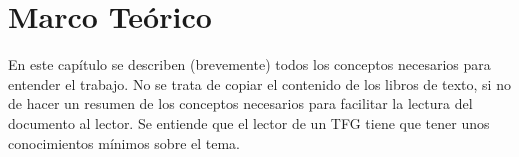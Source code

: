 \chapter{Marco Teórico}

En este capítulo se describen (brevemente) todos los conceptos necesarios para entender el trabajo. No se trata de copiar el contenido de los libros de texto, si no de hacer un resumen de los conceptos necesarios para facilitar la lectura del documento al lector. Se entiende que el lector de un TFG tiene que tener unos conocimientos mínimos sobre el tema.
